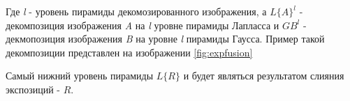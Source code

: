 Где \textit{l} - уровень пирамиды декомозированного изображения, а \textit{$L\{A\}^l$} - декомпозиция изображения \textit{A} на \textit{l} уровне пирамиды Лапласса и $G{B}^l$ - декмопозиция изображения \textit{B} на уровне \textit{l} пирамиды Гаусса. Пример такой декомпозиции представлен на изображении \ref{fig:expfusion}

\begin{figure}[ht!]
\end{figure}

Самый нижний уровень пирамиды $L\{R\}$ и будет являться результатом слияния экспозиций - $R$.
